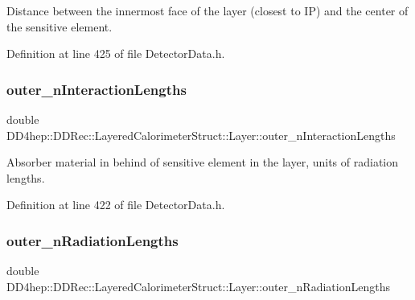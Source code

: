 Distance between the innermost face of the layer (closest to IP) and the center of the sensitive element. 



Definition at line 425 of file Detector\+Data.\+h.

\hypertarget{struct_d_d4hep_1_1_d_d_rec_1_1_layered_calorimeter_struct_1_1_layer_abf4dac9dd33fe0ac0eeb033bd0daa420}{}\label{struct_d_d4hep_1_1_d_d_rec_1_1_layered_calorimeter_struct_1_1_layer_abf4dac9dd33fe0ac0eeb033bd0daa420} 
\subsubsection{\texorpdfstring{outer\+\_\+n\+Interaction\+Lengths}{outer\_nInteractionLengths}}
{\footnotesize\ttfamily double D\+D4hep\+::\+D\+D\+Rec\+::\+Layered\+Calorimeter\+Struct\+::\+Layer\+::outer\+\_\+n\+Interaction\+Lengths}



Absorber material in behind of sensitive element in the layer, units of radiation lengths. 



Definition at line 422 of file Detector\+Data.\+h.

\hypertarget{struct_d_d4hep_1_1_d_d_rec_1_1_layered_calorimeter_struct_1_1_layer_af46a77937ad8427edb903e291e5370fd}{}\label{struct_d_d4hep_1_1_d_d_rec_1_1_layered_calorimeter_struct_1_1_layer_af46a77937ad8427edb903e291e5370fd} 
\subsubsection{\texorpdfstring{outer\+\_\+n\+Radiation\+Lengths}{outer\_nRadiationLengths}}
{\footnotesize\ttfamily double D\+D4hep\+::\+D\+D\+Rec\+::\+Layered\+Calorimeter\+Struct\+::\+Layer\+::outer\+\_\+n\+Radiation\+Lengths}



